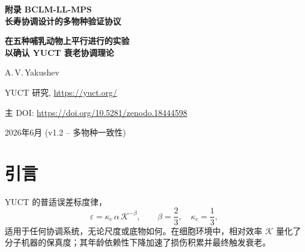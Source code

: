 \documentclass[12pt,a4paper]{article}
\newcommand{\REL}{\mathcal{K}}          %
\begin{document}
	
	\begin{titlepage}
		\centering
		\vspace*{2cm}
		{\Huge\bfseries 附录 BCLM-LL-MPS\\[0.3cm]
			长寿协调设计的多物种验证协议\par}
		\vspace{0.5cm}
		{\Large\bfseries 在五种哺乳动物上平行进行的实验\\
			以确认 YUCT 衰老协调理论\par}
		\vspace{1.5cm}
		{\large A.\,V.\,Yakushev\par}
		{\normalsize YUCT 研究, \url{https://yuct.org/}\par}
		\vspace{0.5cm}
		{\normalsize 主 DOI: \url{https://doi.org/10.5281/zenodo.18444598}\par}
		\vspace{0.5cm}
		{\normalsize 2026年6月 (v1.2 – 多物种一致性)\par}
		\vfill
		\begin{abstract}
			\noindent
			YUCT 生物协调拉格朗日量 (BCLM) 使得仅从序列数据就能预测任何蛋白质或途径的协调效率 \(K_{\mathrm{eff}}\)。为了证明衰老协调理论的普适性，我们提出了一个平行实验设计，涵盖五种广泛使用的实验室哺乳动物：小鼠（\textit{Mus musculus}）、大鼠（\textit{Rattus norvegicus}）、猪（\textit{Sus scrofa}）、食蟹猕猴（\textit{Macaca fascicularis}）和狗（\textit{Canis familiaris}）。对于每个物种，我们识别同源靶基因，使用 BCLM 流程计算其天然和优化后的相对协调效率 \(\REL\)，并直接从普适误差律 \(\varepsilon = \kappa_c \alpha \REL^{-\beta}\)（\(\beta=2/3\)，\(\kappa_c=1/3\)）推导出突变率、氧化应激、蛋白质聚集、迁移速度和复制寿命的定量预言。一个比较表包含了人类细胞的相应值（来自配套协议 BCLM‑LL）。该实验仅依赖市售细胞系、公共序列数据库和标准细胞生物学检测。一个受控回归 (CCR) 模块确认了衰老表型跨物种的可逆性。所有预言均已预注册且可证伪。本协议有意省略 \textit{体内} 递送方法；伦理方面在附录~\(\Sigma\) 中讨论。
		\end{abstract}
	\end{titlepage}
	
	\tableofcontents
	\newpage
	
	\section{引言}
	\label{sec:intro}
	YUCT 的普适误差标度律，
	\begin{equation}
		\varepsilon = \kappa_c \, \alpha \, \REL^{-\beta}, \qquad \beta = \frac{2}{3},\quad \kappa_c = \frac{1}{3},
		\label{eq:error-law}
	\end{equation}
	适用于任何协调系统，无论尺度或底物如何。在细胞环境中，相对效率 \(\REL\) 量化了分子机器的保真度；其年龄依赖性下降加速了损伤积累并最终触发衰老。
	
\end{document}
